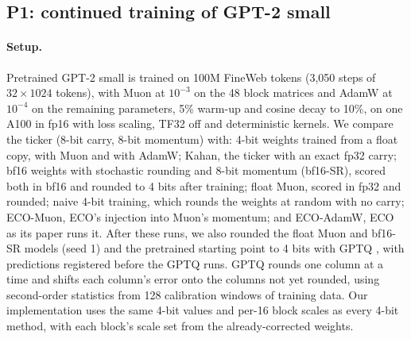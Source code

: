 \documentclass[11pt]{article}
\begin{document}
\subsection{P1: continued training of GPT-2 small}\label{sec:p1}
\paragraph{Setup.} Pretrained GPT-2 small \citep{radford2019gpt2} is trained on 100M FineWeb tokens (3,050 steps of
$32\times1024$ tokens), with Muon at $10^{-3}$ on the 48 block matrices and AdamW at $10^{-4}$ on the remaining
parameters, 5\% warm-up and cosine decay to 10\%, on one A100 in fp16 with loss scaling, TF32 off and deterministic
kernels. We compare the ticker (8-bit carry, 8-bit momentum) with: 4-bit weights trained from a float copy, with Muon
and with AdamW; Kahan, the ticker with an exact fp32 carry; bf16 weights with stochastic rounding and 8-bit momentum
(bf16-SR), scored both in bf16 and rounded to 4 bits after training; float Muon, scored in fp32 and rounded; naive
4-bit training, which rounds the weights at random with no carry; ECO-Muon, ECO's injection into Muon's momentum; and
ECO-AdamW, ECO as its paper runs it. After these runs, we also rounded the float Muon and bf16-SR models (seed 1) and
the pretrained starting point to 4 bits with GPTQ \citep{frantar2023gptq}, with predictions registered before the
GPTQ runs. GPTQ rounds one column at a time and shifts each column's error onto the columns not yet rounded, using
second-order statistics from 128 calibration windows of training data. Our implementation uses the same 4-bit values
and per-16 block scales as every 4-bit method, with each block's scale set from the already-corrected weights.
\end{document}
